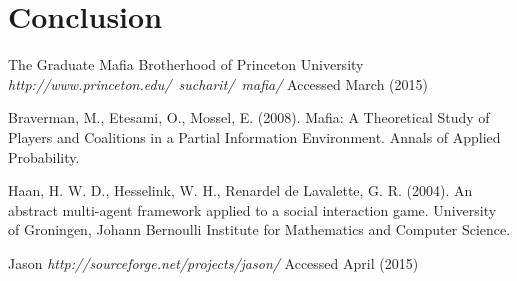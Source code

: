 \documentclass[12pt]{article} %
\begin{document}






\section{Conclusion}



\begin{thebibliography}{99} %

The Graduate Mafia Brotherhood of Princeton University
\emph{http://www.princeton.edu/~sucharit/~mafia/}
Accessed March (2015)

Braverman, M., Etesami, O., Mossel, E. (2008).
Mafia: A Theoretical Study of Players and Coalitions in a Partial Information Environment.
Annals of Applied Probability.

Haan, H. W. D., Hesselink, W. H., Renardel de Lavalette, G. R. (2004).
An abstract multi-agent framework applied to a social interaction game.
University of Groningen, Johann Bernoulli Institute for Mathematics and Computer Science.

Jason
\emph{http://sourceforge.net/projects/jason/}
Accessed April (2015)


 
\end{thebibliography}

\end{document}
